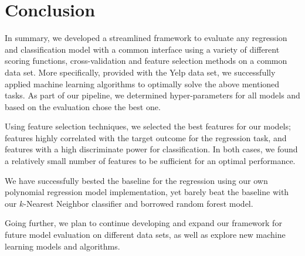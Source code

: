 \section{Conclusion}
\label{sec:five}

In summary, we developed a streamlined framework to evaluate any regression and
classification model with a common interface using a variety of different
scoring functions, cross-validation and feature selection methods on a common
data set.  More specifically, provided with the Yelp data set, we successfully
applied machine learning algorithms to optimally solve the above mentioned
tasks.  As part of our pipeline, we determined hyper-parameters for all models
and based on the evaluation chose the best one.

Using feature selection techniques, we selected the best features for our
models; features highly correlated with the target outcome for the regression
task, and features with a high discriminate power for classification.  In both
cases, we found a relatively small number of features to be sufficient for an
optimal performance.

We have successfully bested the baseline for the regression using our own
polynomial regression model implementation, yet barely beat the baseline with
our $k$-Nearest Neighbor classifier and borrowed random forest model.

Going further, we plan to continue developing and expand our framework for
future model evaluation on different data sets, as well as explore new machine
learning models and algorithms.

